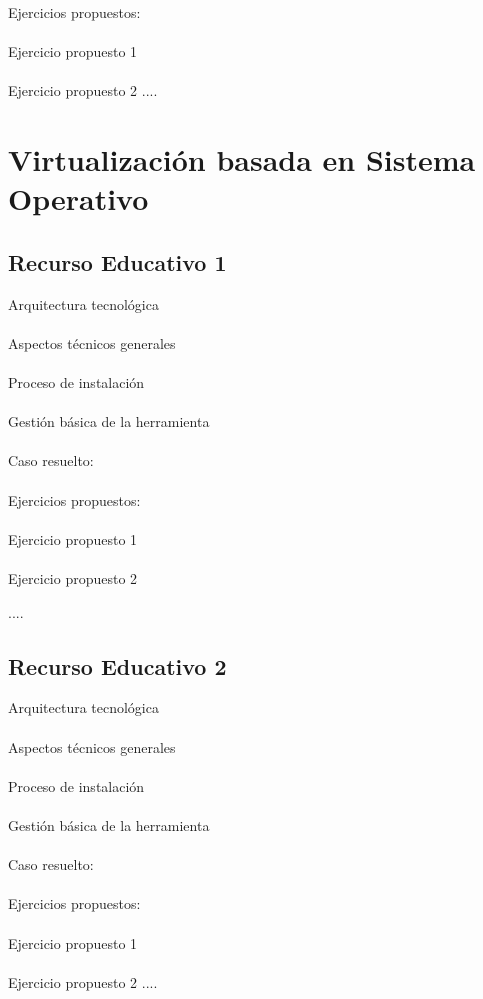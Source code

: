 Ejercicios propuestos: 
\\\\

Ejercicio propuesto 1
\\\\

Ejercicio propuesto 2
....
\section{Virtualización basada en Sistema Operativo}
\subsection{Recurso Educativo 1}
Arquitectura tecnológica
\\\\
Aspectos técnicos generales
\\\\
Proceso de instalación
\\\\
Gestión básica de la herramienta
\\\\
Caso resuelto: 
\\\\

Ejercicios propuestos: 
\\\\

Ejercicio propuesto 1
\\\\

Ejercicio propuesto 2

....

\subsection{Recurso Educativo 2}
Arquitectura tecnológica
\\\\
Aspectos técnicos generales
\\\\
Proceso de instalación
\\\\
Gestión básica de la herramienta
\\\\
Caso resuelto: 
\\\\

Ejercicios propuestos: 
\\\\

Ejercicio propuesto 1
\\\\

Ejercicio propuesto 2
....

